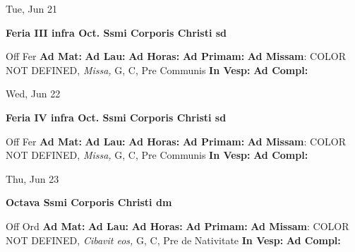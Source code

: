 \documentclass[10pt]{memoir}
\begin{document}
\begin{center}
\begin{minipage}{3.5in}
\vspace{2em}
\begin{center}Tue, Jun 21
\end{center}
\textbf{ \large Feria III infra Oct. Ssmi Corporis Christi
\textnormal{\normalsize sd}}

\begin{justify}Off Fer
\textbf{Ad Mat: }
\textbf{Ad Lau: }
\textbf{Ad Horas: }
\textbf{Ad Primam: }\textbf{Ad Missam}: COLOR NOT DEFINED, \textit{Missa,} G, C, Pre Communis
\textbf{In Vesp: }
\textbf{Ad Compl: }
\end{justify}
\end{minipage}
\end{center}

\begin{center}
\begin{minipage}{3.5in}
\vspace{2em}
\begin{center}Wed, Jun 22
\end{center}
\textbf{ \large Feria IV infra Oct. Ssmi Corporis Christi
\textnormal{\normalsize sd}}

\begin{justify}Off Fer
\textbf{Ad Mat: }
\textbf{Ad Lau: }
\textbf{Ad Horas: }
\textbf{Ad Primam: }\textbf{Ad Missam}: COLOR NOT DEFINED, \textit{Missa,} G, C, Pre Communis
\textbf{In Vesp: }
\textbf{Ad Compl: }
\end{justify}
\end{minipage}
\end{center}

\begin{center}
\begin{minipage}{3.5in}
\vspace{2em}
\begin{center}Thu, Jun 23
\end{center}
\textbf{ \large Octava Ssmi Corporis Christi
\textnormal{\normalsize dm}}

\begin{justify}Off Ord
\textbf{Ad Mat: }
\textbf{Ad Lau: }
\textbf{Ad Horas: }
\textbf{Ad Primam: }\textbf{Ad Missam}: COLOR NOT DEFINED, \textit{Cibavit eos,} G, C, Pre de Nativitate
\textbf{In Vesp: }
\textbf{Ad Compl: }
\end{justify}
\end{minipage}
\end{center}
\end{document}
